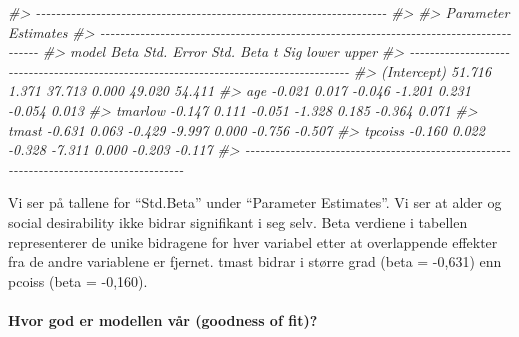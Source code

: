 \documentclass[
]{article}
\newenvironment{Shaded}{\begin{snugshade}}{\end{snugshade}}
\newcommand{\CommentTok}[1]{\textcolor[rgb]{0.56,0.35,0.01}{\textit{#1}}}
\begin{document}
\begin{Shaded}
\begin{Highlighting}[]
\CommentTok{\#\textgreater{} {-}{-}{-}{-}{-}{-}{-}{-}{-}{-}{-}{-}{-}{-}{-}{-}{-}{-}{-}{-}{-}{-}{-}{-}{-}{-}{-}{-}{-}{-}{-}{-}{-}{-}{-}{-}{-}{-}{-}{-}{-}{-}{-}{-}{-}{-}{-}{-}{-}{-}{-}{-}{-}{-}{-}{-}{-}{-}{-}{-}{-}{-}{-}{-}{-}{-}{-}{-}{-}{-}}
\CommentTok{\#\textgreater{} }
\CommentTok{\#\textgreater{}                                   Parameter Estimates                                    }
\CommentTok{\#\textgreater{} {-}{-}{-}{-}{-}{-}{-}{-}{-}{-}{-}{-}{-}{-}{-}{-}{-}{-}{-}{-}{-}{-}{-}{-}{-}{-}{-}{-}{-}{-}{-}{-}{-}{-}{-}{-}{-}{-}{-}{-}{-}{-}{-}{-}{-}{-}{-}{-}{-}{-}{-}{-}{-}{-}{-}{-}{-}{-}{-}{-}{-}{-}{-}{-}{-}{-}{-}{-}{-}{-}{-}{-}{-}{-}{-}{-}{-}{-}{-}{-}{-}{-}{-}{-}{-}{-}{-}{-}}
\CommentTok{\#\textgreater{}       model      Beta    Std. Error    Std. Beta      t        Sig      lower     upper }
\CommentTok{\#\textgreater{} {-}{-}{-}{-}{-}{-}{-}{-}{-}{-}{-}{-}{-}{-}{-}{-}{-}{-}{-}{-}{-}{-}{-}{-}{-}{-}{-}{-}{-}{-}{-}{-}{-}{-}{-}{-}{-}{-}{-}{-}{-}{-}{-}{-}{-}{-}{-}{-}{-}{-}{-}{-}{-}{-}{-}{-}{-}{-}{-}{-}{-}{-}{-}{-}{-}{-}{-}{-}{-}{-}{-}{-}{-}{-}{-}{-}{-}{-}{-}{-}{-}{-}{-}{-}{-}{-}{-}{-}}
\CommentTok{\#\textgreater{} (Intercept)    51.716         1.371                 37.713    0.000    49.020    54.411 }
\CommentTok{\#\textgreater{}         age    {-}0.021         0.017       {-}0.046    {-}1.201    0.231    {-}0.054     0.013 }
\CommentTok{\#\textgreater{}     tmarlow    {-}0.147         0.111       {-}0.051    {-}1.328    0.185    {-}0.364     0.071 }
\CommentTok{\#\textgreater{}       tmast    {-}0.631         0.063       {-}0.429    {-}9.997    0.000    {-}0.756    {-}0.507 }
\CommentTok{\#\textgreater{}     tpcoiss    {-}0.160         0.022       {-}0.328    {-}7.311    0.000    {-}0.203    {-}0.117 }
\CommentTok{\#\textgreater{} {-}{-}{-}{-}{-}{-}{-}{-}{-}{-}{-}{-}{-}{-}{-}{-}{-}{-}{-}{-}{-}{-}{-}{-}{-}{-}{-}{-}{-}{-}{-}{-}{-}{-}{-}{-}{-}{-}{-}{-}{-}{-}{-}{-}{-}{-}{-}{-}{-}{-}{-}{-}{-}{-}{-}{-}{-}{-}{-}{-}{-}{-}{-}{-}{-}{-}{-}{-}{-}{-}{-}{-}{-}{-}{-}{-}{-}{-}{-}{-}{-}{-}{-}{-}{-}{-}{-}{-}}
\end{Highlighting}
\end{Shaded}

Vi ser på tallene for ``Std.Beta'' under ``Parameter Estimates''. Vi ser at alder og social desirability ikke bidrar signifikant i seg selv. Beta verdiene i tabellen representerer de unike bidragene for hver variabel etter at overlappende effekter fra de andre variablene er fjernet. tmast bidrar i større grad (beta = -0,631) enn pcoiss (beta = -0,160).

\hypertarget{hvor-god-er-modellen-vuxe5r-goodness-of-fit-2}{%
\paragraph{Hvor god er modellen vår (goodness of fit)?}\label{hvor-god-er-modellen-vuxe5r-goodness-of-fit-2}}
\end{document}
